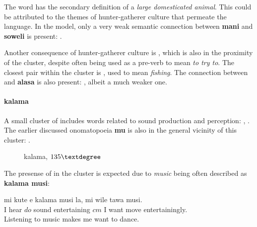 \documentclass[14pt, a4paper]{extreport}
\makeatletter
\DeclareRobustCommand\ttfamily
        {\not@math@alphabet\ttfamily\mathtt
         \fontfamily\ttdefault\small\selectfont}
\makeatother
\begin{document}
The word  has the secondary definition of a \textit{large domesticated animal}. This could be attributed to the themes of hunter-gatherer culture that permeate the language. In the model, only a very weak semantic connection between \textbf{mani} and \textbf{soweli} is present: .

Another consequence of hunter-gatherer culture is , which is also in the proximity of the cluster, despite often being used as a pre-verb to mean \textit{to try to}. The closest pair within the cluster is , used to mean \textit{fishing}. The connection between  and \textbf{alasa} is also present: , albeit a much weaker one.
        \paragraph{kalama}
A small cluster of  includes words related to sound production and perception: , . The earlier discussed onomatopoeia \textbf{mu} is also in the general vicinity of this cluster: .

\begin{figure}[ht]%
  \def\angle{135}
  \bigskip
  \centering
  \caption{kalama, \(\angle\textdegree\)}
\end{figure}%

The presense of  in the cluster is expected due to \textit{music} being often described as \textbf{kalama musi}:

\begin{exe}
  \ex
  \gll mi kute e kalama musi la, mi wile tawa musi. \\
       I hear $do$ sound entertaining $cm$ I want move entertainingly. \\
  \glt Listening to music makes me want to dance.
\end{exe}
\end{document}
